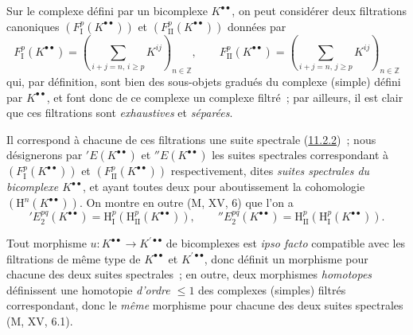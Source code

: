 \begin{env}[11.3.2]
\label{0.11.3.2-fr}
Sur le complexe défini par un bicomplexe $K^{\bullet\bullet}$, on peut
considérer deux filtrations canoniques
$(F_{\mathrm I}^p(K^{\bullet\bullet}))$ et
$(F_{\mathrm{II}}^p(K^{\bullet\bullet}))$ données par
\[
\label{0.11.3.2.1-fr}
  F_{\mathrm I}^p(K^{\bullet\bullet})
  =\left(\sum_{i+j=n,\,i\geq p}K^{ij}\right)_{n\in\mathbb Z},
  \qquad
  F_{\mathrm{II}}^p(K^{\bullet\bullet})
  =\left(\sum_{i+j=n,\,j\geq p}K^{ij}\right)_{n\in\mathbb Z}
  \tag{11.3.2.1}
\]
qui, par définition, sont bien des sous-objets gradués du complexe (simple)
défini par $K^{\bullet\bullet}$, et font donc de ce complexe un complexe
filtré~; par ailleurs, il est clair que ces filtrations sont \emph{exhaustives} et
\emph{séparées}.

Il correspond à chacune de ces filtrations une suite spectrale
(\hyperref[0.11.2.2-fr]{11.2.2})~; nous désignerons par
$'E(K^{\bullet\bullet})$ et $''E(K^{\bullet\bullet})$ les suites spectrales
correspondant à $(F_{\mathrm I}^p(K^{\bullet\bullet}))$ et
$(F_{\mathrm{II}}^p(K^{\bullet\bullet}))$ respectivement, dites
\emph{suites spectrales du bicomplexe $K^{\bullet\bullet}$}, et ayant toutes
deux pour aboutissement la cohomologie
$(\mathrm H^n(K^{\bullet\bullet}))$. On montre en outre (M, XV, 6) que l'on a
\[
\label{0.11.3.2.2-fr}
  'E_2^{pq}(K^{\bullet\bullet})
  =\mathrm H_{\mathrm I}^p(\mathrm H_{\mathrm{II}}^p(K^{\bullet\bullet})),
  \qquad
  ''E_2^{pq}(K^{\bullet\bullet})
  =\mathrm H_{\mathrm{II}}^p(\mathrm H_{\mathrm I}^p(K^{\bullet\bullet})).
  \tag{11.3.2.2}
\]

Tout morphisme $u:K^{\bullet\bullet}\to K^{\prime\bullet\bullet}$ de
bicomplexes est \emph{ipso facto} compatible avec les filtrations de même
type de $K^{\bullet\bullet}$ et $K^{\prime\bullet\bullet}$, donc définit un
morphisme pour chacune des deux suites spectrales~; en outre, deux morphismes
\emph{homotopes} définissent une homotopie \emph{d'ordre $\leq1$} des
complexes (simples) filtrés correspondant, donc le \emph{même} morphisme pour
chacune des deux suites spectrales (M, XV, 6.1).
\end{env}

